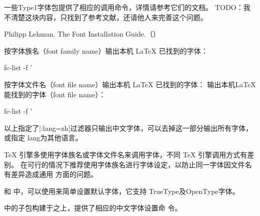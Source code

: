 





一些Type1字体包提供了相应的调用命令，详情请参考它们的文档。
TODO：我不清楚这块内容，只找到了参考文献，还请他人来完善这个问题。
\begin{reference}
  \item Philipp Lehman. The Font Installation Guide.（）
\end{reference}







按字体族名（font family name）输出本机 \LaTeX{} 已找到的字体：
\begin{shcode}
 fc-list -f '%
\end{shcode}

按字体文件名（font file name）输出本机 \LaTeX{} 已找到的字体：
输出本机LaTeX能找到的字体（font file name）：
\begin{shcode}
 fc-list -f '%
\end{shcode}

以上指定了|:lang=zh|过滤器只输出中文字体，可以去掉这一部分输出所有字体，或指定
lang为其他语言。



\TeX{} 引擎多使用字体族名或字体文件名来调用字体，不同 \TeX{} 引擎调用方式有差别。
在可行的情况下推荐使用字体族名进行字体设定，以防止同一字体因文件名有差异造成通用
方面的问题。

\XeLaTeX{} 和 \LuaLaTeX{} 中，可以使用来简单设置默认字体，它支持
TrueType及OpenType字体。
\begin{texlist}
\setmainfont{Libertinus Serif}
\setsansfont{TeX Gyre Heros}
\setmonofont{Libertinus Mono}
\end{texlist}

中的子包构建于之上，提供了相应的中文字体设置命
令。

